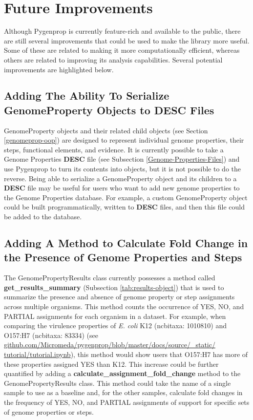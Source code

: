 \section{Future Improvements}

Although Pygenprop is currently feature-rich and available to the public, there are still several improvements that could be used to make the library more useful. Some of these are related to making it more computationally efficient, whereas others are related to improving its analysis capabilities. Several potential improvements are highlighted below.

\subsection{Adding The Ability To Serialize GenomeProperty Objects to DESC Files}

GenomeProperty objects and their related child objects (see Section \ref{genomeprop-oop}) are designed to represent individual genome properties, their steps, functional elements, and evidence. It is currently possible to take a Genome Properties \textbf{DESC} file (see Subsection \ref{Genome-Properties-Files}) and use Pygenprop to turn its contents into objects, but it is not possible to do the reverse. Being able to serialize a GenomeProperty object and its children to a \textbf{DESC} file may be useful for users who want to add new genome properties to the Genome Properties database. For example, a custom GenomeProperty object could be built programmatically, written to \textbf{DESC} files, and then this file could be added to the database.

\subsection{Adding A Method to Calculate Fold Change in the Presence of Genome Properties and Steps}

The GenomePropertyResults class currently possesses a method called \textbf{get\_results\_summary} (Subsection \ref{tab:results-object}) that is used to summarize the presence and absence of genome property or step assignments across multiple organisms. This method counts the occurrence of YES, NO, and PARTIAL assignments for each organism in a dataset. For example, when comparing the virulence properties of \textit{E. coli} K12 (\gls{ncbitaxa}: 1010810) and O157:H7 (\gls{ncbitaxa}: 83334) (see \href{http://github.com/Micromeda/pygenprop/blob/master/docs/source/_static/tutorial/tutorial.ipynb}{github.com/Micromeda/pygenprop/blob/master/docs/source/\_static/ tutorial/tutorial.ipynb}), this method would show users that O157:H7 has more of these properties assigned YES than K12. This increase could be further quantified by adding a \textbf{calculate\_assignment\_fold\_change} method to the GenomePropertyResults class. This method could take the name of a single sample to use as a baseline and, for the other samples, calculate fold changes in the frequency of YES, NO, and PARTIAL assignments of support for specific sets of genome properties or steps.

